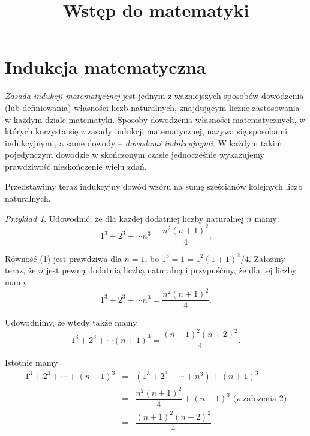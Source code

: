 \documentclass[a4paper,12pt]{article}
\title{Wstęp do matematyki}
\author{}
\date{}
\theoremstyle{remark}
\newtheorem{example}[definition]{Przykład}
\begin{document}
\maketitle

\section{Indukcja matematyczna}

\textit{Zasada indukcji matematycznej} jest jednym z ważniejszych sposobów dowodzenia (lub definiowania) własności liczb naturalnych, znajdującym liczne zastosowania w każdym dziale matematyki. Sposoby dowodzenia własności matematycznych, w których korzysta się z zasady indukcji matematycznej, nazywa się sposobami indukcyjnymi, a same dowody – \textit{dowodami indukcyjnymi}. W każdym takim pojedynczym dowodzie w skończonym czasie jednocześnie wykazujemy prawdziwość nieskończenie wielu zdań.

Przedstawimy teraz indukcyjny dowód wzóru na sumę sześcianów kolejnych liczb naturalnych.

\begin{example}
    Udowodnić, że dla każdej dodatniej liczby naturalnej $n$ mamy:
    \begin{equation}
        1^3 + 2^3 + \cdots n^3 = \frac{n^2(n+1)^2}{4}.
    \end{equation}
\end{example}

Równość (1) jest prawdziwa dla $n=1$, bo $1^3=1=1^2(1+1)^2/4$. Założmy teraz, że $n$ jest pewną dodatnią liczbą naturalną i przypuśćmy, że dla tej liczby mamy
\begin{equation}
    1^3 + 2^3 + \cdots n^3 = \frac{n^2(n+1)^2}{4}.
\end{equation}

Udowodnimy, że wtedy także mamy
\begin{equation*}
    1^3 + 2^3 + \cdots (n+1)^3 = \frac{(n+1)^2(n+2)^2}{4}.
\end{equation*}

\newpage

Istotnie mamy
\begin{eqnarray*}
     1^3 + 2^3 + \cdots + (n+1)^3 & = & (1^3 + 2^3 + \cdots + n^3) + (n+1)^3 \\
     & = & \dfrac{n^2(n+1)^2}{4} + (n+1)^3 \text{ (z założenia 2)} \\
     & = & \dfrac{(n+1)^2(n+2)^2}{4}
\end{eqnarray*}
\end{document}
